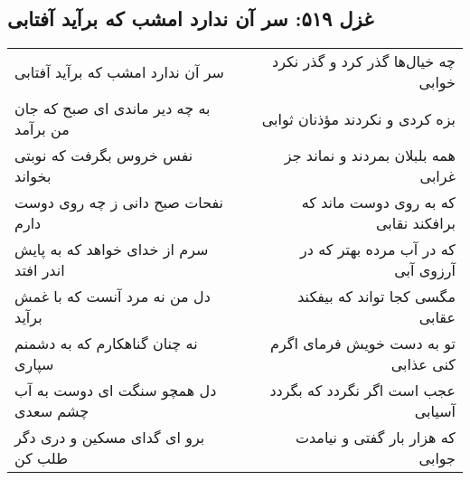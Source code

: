 \begin{center}
\section*{غزل ۵۱۹: سر آن ندارد امشب که برآید آفتابی}
\label{sec:519}
\begin{longtable}{l p{0.5cm} r}
سر آن ندارد امشب که برآید آفتابی
&&
چه خیال‌ها گذر کرد و گذر نکرد خوابی
\\
به چه دیر ماندی ای صبح که جان من برآمد
&&
بزه کردی و نکردند مؤذنان ثوابی
\\
نفس خروس بگرفت که نوبتی بخواند
&&
همه بلبلان بمردند و نماند جز غرابی
\\
نفحات صبح دانی ز چه روی دوست دارم
&&
که به روی دوست ماند که برافکند نقابی
\\
سرم از خدای خواهد که به پایش اندر افتد
&&
که در آب مرده بهتر که در آرزوی آبی
\\
دل من نه مرد آنست که با غمش برآید
&&
مگسی کجا تواند که بیفکند عقابی
\\
نه چنان گناهکارم که به دشمنم سپاری
&&
تو به دست خویش فرمای اگرم کنی عذابی
\\
دل همچو سنگت ای دوست به آب چشم سعدی
&&
عجب است اگر نگردد که بگردد آسیابی
\\
برو ای گدای مسکین و دری دگر طلب کن
&&
که هزار بار گفتی و نیامدت جوابی
\\
\end{longtable}
\end{center}
